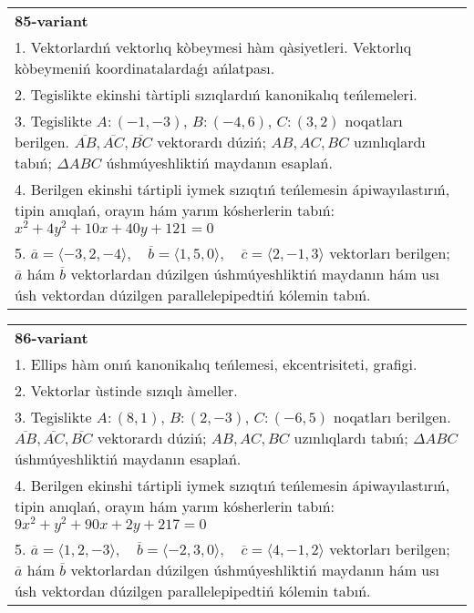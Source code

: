 \documentclass{article}
\begin{document}
\begin{tabular}{m{17cm}}
\textbf{85-variant}\\
1. Vektorlardıń vektorlıq kòbeymesi hàm qàsiyetleri. Vektorlıq kòbeymeniń koordinatalardaǵı ańlatpası. \\

2. Tegislikte ekinshi tàrtipli sızıqlardıń kanonikalıq teńlemeleri.\\

3. Tegislikte $A: (-1, -3)$, $B: (-4, 6)$, $C: (3, 2)$ noqatları berilgen. $\overline{AB}, \overline{AC}, \overline{BC}$ vektorardı dúziń; $AB, AC, BC$ uzınlıqlardı tabıń; $\Delta ABC$ úshmúyeshliktiń maydanın esaplań. \\

4. Berilgen ekinshi tártipli iymek sızıqtıń teńlemesin ápiwayılastırıń, tipin anıqlań, orayın hám yarım kósherlerin tabıń: $x^2+4y^2+10x+40y+121=0$\\

5. \(\overline{a} = \langle -3, 2, -4 \rangle, \quad \overline{b} = \langle 1, 5, 0 \rangle, \quad \overline{c} = \langle 2, -1, 3 \rangle\) vektorları berilgen; \(\overline{a}\) hám \(\overline{b}\) vektorlardan dúzilgen úshmúyeshliktiń maydanın hám usı úsh vektordan dúzilgen parallelepipedtiń kólemin tabıń.
\end{tabular}
\vspace{1cm}


\begin{tabular}{m{17cm}}
\textbf{86-variant}\\
1. Ellips hàm onıń kanonikalıq teńlemesi, ekcentrisiteti, grafigi.\\

2. Vektorlar ùstinde sızıqlı àmeller.\\

3. Tegislikte $A: (8, 1)$, $B: (2, -3)$, $C: (-6, 5)$ noqatları berilgen. $\overline{AB}, \overline{AC}, \overline{BC}$ vektorardı dúziń; $AB, AC, BC$ uzınlıqlardı tabıń; $\Delta ABC$ úshmúyeshliktiń maydanın esaplań. \\

4. Berilgen ekinshi tártipli iymek sızıqtıń teńlemesin ápiwayılastırıń, tipin anıqlań, orayın hám yarım kósherlerin tabıń: $9x^2+y^2+90x+2y+217=0$\\

5. \(\overline{a} = \langle 1, 2, -3 \rangle, \quad \overline{b} = \langle -2, 3, 0 \rangle, \quad \overline{c} = \langle 4, -1, 2 \rangle\) vektorları berilgen; \(\overline{a}\) hám \(\overline{b}\) vektorlardan dúzilgen úshmúyeshliktiń maydanın hám usı úsh vektordan dúzilgen parallelepipedtiń kólemin tabıń.
\end{tabular}
\vspace{1cm}
\end{document}
